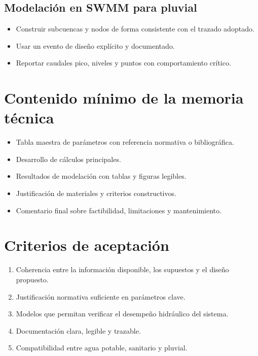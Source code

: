 \documentclass[11pt]{article}
\begin{document}
\subsection{Modelaci\'on en SWMM para pluvial}
\begin{itemize}
\item Construir subcuencas y nodos de forma consistente con el trazado adoptado.
\item Usar un evento de dise\~no expl\'icito y documentado.
\item Reportar caudales pico, niveles y puntos con comportamiento cr\'itico.
\end{itemize}

\section{Contenido m\'inimo de la memoria t\'ecnica}
\begin{itemize}
\item Tabla maestra de par\'ametros con referencia normativa o bibliogr\'afica.
\item Desarrollo de c\'alculos principales.
\item Resultados de modelaci\'on con tablas y figuras legibles.
\item Justificaci\'on de materiales y criterios constructivos.
\item Comentario final sobre factibilidad, limitaciones y mantenimiento.
\end{itemize}

\section{Criterios de aceptaci\'on}
\begin{enumerate}
\item Coherencia entre la informaci\'on disponible, los supuestos y el dise\~no propuesto.
\item Justificaci\'on normativa suficiente en par\'ametros clave.
\item Modelos que permitan verificar el desempe\~no hidr\'aulico del sistema.
\item Documentaci\'on clara, legible y trazable.
\item Compatibilidad entre agua potable, sanitario y pluvial.
\end{enumerate}
\end{document}
